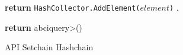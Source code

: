 \begin{figure}[t!]
  \begin{adjustbox}{minipage=[t]{\columnwidth}}
    \begin{algorithm}[H]
      \renewcommand{\thealgorithm}{API Hashchain}         
      \caption{\small API Setchain Hashchain}%
      \label{alg:api-hashchain}%
      \small
      \begin{algorithmic}[1]
      
            \label{alg:hash_add}
                \State \textbf{return} \texttt{HashCollector.AddElement($element$)}
                .
            \EndFunction
      
            \label{alg:hash_get}
                	\State \textbf{return} \<abciquery>()
            \EndFunction
            
        \end{algorithmic}
      \end{algorithm}
	\end{adjustbox}
  \end{figure}
